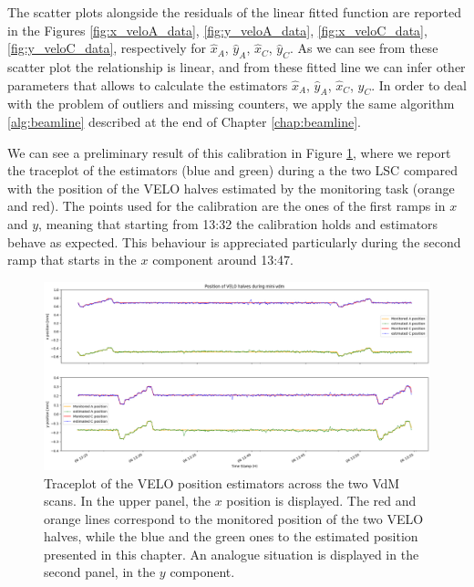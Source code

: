 The scatter plots alongside the residuals of the linear fitted function are reported in the Figures \ref{fig:x_veloA_data}, \ref{fig:y_veloA_data}, \ref{fig:x_veloC_data}, \ref{fig:y_veloC_data}, respectively for $\hat{x}_A$, $\hat{y}_A$, $\hat{x}_C$, $\hat{y}_C$. As we can see from these scatter plot the relationship is linear, and from these fitted line we can infer other parameters that allows to calculate the estimators $\hat{x}_A$, $\hat{y}_A$, $\hat{x}_C$, $\hat{y}_C$. In order to deal with the problem of outliers and missing counters, we apply the same algorithm \ref{alg:beamline} described at the end of Chapter \ref{chap:beamline}. 

We can see a preliminary result of this calibration in Figure \ref{fig:traceplot_xy}, where we report the traceplot of the estimators (blue and green) during a the two LSC compared with the position of the VELO halves estimated by the monitoring task (orange and red). The points used for the calibration are the ones of the first ramps in $x$ and $y$, meaning that starting from 13:32 the calibration holds and estimators behave as expected. This behaviour is appreciated particularly during the second ramp that starts in the $x$ component around 13:47.

\begin{figure}
    \centering
    \includegraphics[width=\textwidth]{figures/traceplot_xy.png}
    \caption{Traceplot of the VELO position estimators across the two VdM scans. In the upper panel, the $x$ position is displayed. The red and orange lines correspond to the monitored position of the two VELO halves, while the blue and the green ones to the estimated position presented in this chapter. An analogue situation is displayed in the second panel, in the $y$ component.}
    \label{fig:traceplot_xy}
\end{figure}


